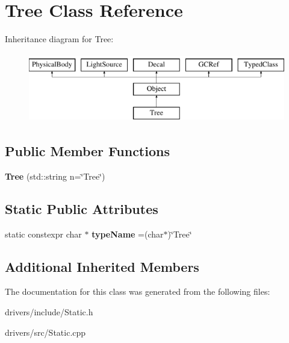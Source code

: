 \hypertarget{classTree}{}\section{Tree Class Reference}
\label{classTree}
Inheritance diagram for Tree\+:\begin{figure}[H]
\begin{center}
\leavevmode
\includegraphics[height=3.000000cm]{classTree}
\end{center}
\end{figure}
\subsection*{Public Member Functions}
\begin{DoxyCompactItemize}
\item 
\hypertarget{classTree_ae87378915fea4c31cca95e768b62f2c1}{}{\bfseries Tree} (std\+::string n=\char`\"{}Tree\char`\"{})\label{classTree_ae87378915fea4c31cca95e768b62f2c1}

\end{DoxyCompactItemize}
\subsection*{Static Public Attributes}
\begin{DoxyCompactItemize}
\item 
\hypertarget{classTree_aaa9a72f41d4a4dbb7c86ddc8b1711473}{}static constexpr char $\ast$ {\bfseries type\+Name} =(char$\ast$)\char`\"{}Tree\char`\"{}\label{classTree_aaa9a72f41d4a4dbb7c86ddc8b1711473}

\end{DoxyCompactItemize}
\subsection*{Additional Inherited Members}


The documentation for this class was generated from the following files\+:\begin{DoxyCompactItemize}
\item 
drivers/include/Static.\+h\item 
drivers/src/Static.\+cpp\end{DoxyCompactItemize}

